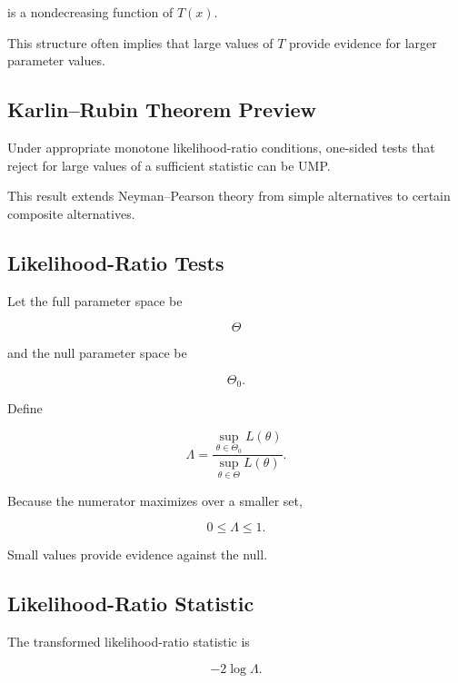 is a nondecreasing function of \(T(x)\).

This structure often implies that large values of \(T\) provide evidence
for larger parameter values.

\subsection{Karlin--Rubin Theorem Preview}
\label{subsec:karlin-rubin-preview}

Under appropriate monotone likelihood-ratio conditions, one-sided tests
that reject for large values of a sufficient statistic can be UMP.

This result extends Neyman--Pearson theory from simple alternatives to
certain composite alternatives.

\subsection{Likelihood-Ratio Tests}
\label{subsec:likelihood-ratio-tests-mathstat}

Let the full parameter space be

\[
\Theta
\]

and the null parameter space be

\[
\Theta_0.
\]

Define

\[
\boxed{
\Lambda
=
\frac{
\sup_{\theta\in\Theta_0}
L(\theta)
}{
\sup_{\theta\in\Theta}
L(\theta)
}.
}
\]

Because the numerator maximizes over a smaller set,

\[
\boxed{
0\leq\Lambda\leq1.
}
\]

Small values provide evidence against the null.

\subsection{Likelihood-Ratio Statistic}
\label{subsec:likelihood-ratio-statistic-mathstat}

The transformed likelihood-ratio statistic is

\[
\boxed{
-2\log\Lambda.
}
\]

